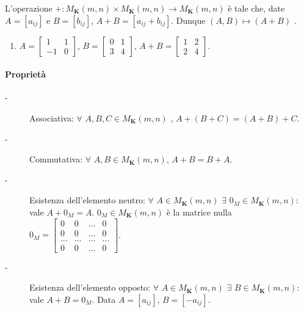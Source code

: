 \documentclass{article}
\begin{document}
L'operazione $+:M_{\mathbf{K}}\left( m,n\right) \times M_{\mathbf{K}}\left(
m,n\right) \rightarrow M_{\mathbf{K}}\left( m,n\right) $ \`{e} tale che,
date $A=\left[ a_{ij}\right] $ e $B=\left[ b_{ij}\right] $, $A+B=\left[
a_{ij}+b_{ij}\right] $. Dunque $\left( A,B\right) \mapsto \left( A+B\right) $%
.

\begin{enumerate}
\item $A=\left[ 
\begin{array}{cc}
1 & 1 \\ 
-1 & 0%
\end{array}%
\right] $, $B=\left[ 
\begin{array}{cc}
0 & 1 \\ 
3 & 4%
\end{array}%
\right] $, $A+B=\left[ 
\begin{array}{cc}
1 & 2 \\ 
2 & 4%
\end{array}%
\right] $.
\end{enumerate}

\paragraph{Propriet\`{a}}

\begin{description}
\item[-] Associativa: $\forall $ $A,B,C\in M_{\mathbf{K}}\left( m,n\right) $%
, $A+\left( B+C\right) =\left( A+B\right) +C$.

\item[-] Commutativa: $\forall $ $A,B\in M_{\mathbf{K}}\left( m,n\right) $, $%
A+B=B+A$.

\item[-] Esistenza dell'elemento neutro: $\forall $ $A\in M_{\mathbf{K}%
}\left( m,n\right) $ $\exists $ $0_{M}\in M_{\mathbf{K}}\left( m,n\right) :$
vale $A+0_{M}=A$. $0_{M}\in M_{\mathbf{K}}\left( m,n\right) $ \`{e} la
matrice nulla $0_{M}=\left[ 
\begin{array}{cccc}
0 & 0 & ... & 0 \\ 
0 & 0 & ... & 0 \\ 
... & ... & ... & ... \\ 
0 & 0 & ... & 0%
\end{array}%
\right] $.

\item[-] Esistenza dell'elemento opposto: $\forall $ $A\in M_{\mathbf{K}%
}\left( m,n\right) $ $\exists $ $B\in M_{\mathbf{K}}\left( m,n\right) :$
vale $A+B=0_{M}$. Data $A=\left[ a_{ij}\right] $, $B=\left[ -a_{ij}\right] $.
\end{description}
\end{document}
